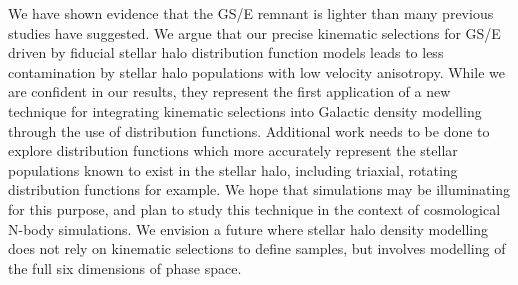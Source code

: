 We have shown evidence that the GS/E remnant is lighter than many previous studies have suggested. We argue that our precise kinematic selections for GS/E driven by fiducial stellar halo distribution function models leads to less contamination by stellar halo populations with low velocity anisotropy. While we are confident in our results, they represent the first application of a new technique for integrating kinematic selections into Galactic density modelling through the use of distribution functions. Additional work needs to be done to explore distribution functions which more accurately represent the stellar populations known to exist in the stellar halo, including triaxial, rotating distribution functions for example. We hope that simulations may be illuminating for this purpose, and plan to study this technique in the context of cosmological N-body simulations. We envision a future where stellar halo density modelling does not rely on kinematic selections to define samples, but involves modelling of the full six dimensions of phase space.




